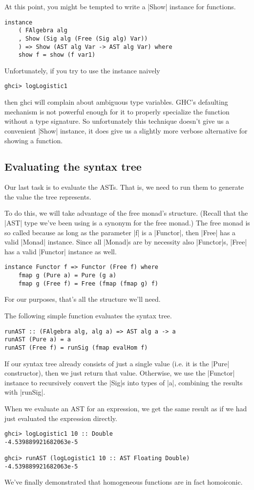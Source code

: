 \documentclass[preprint]{sigplanconf}
\theoremstyle{definition}
\begin{document}
At this point, you might be tempted to write a |Show| instance for functions.
\begin{lstlisting}
instance
    ( FAlgebra alg
    , Show (Sig alg (Free (Sig alg) Var))
    ) => Show (AST alg Var -> AST alg Var) where
    show f = show (f var1)
\end{lstlisting}
Unfortunately, if you try to use the instance naively
\begin{lstlisting}
ghci> logLogistic1
\end{lstlisting}
then ghci will complain about ambiguous type variables.
GHC's defaulting mechanism is not powerful enough for it to properly specialize the function without a type signature.
So unfortunately this technique doesn't give us a convenient |Show| instance,
it does give us a slightly more verbose alternative for showing a function.

\subsection{Evaluating the syntax tree}
Our last task is to evaluate the ASTs.
That is, we need to run them to generate the value the tree represents.

To do this, we will take advantage of the free monad's structure.
(Recall that the |AST| type we've been using is a synonym for the free monad.)
The free monad is so called because as long as the parameter |f| is a |Functor|,
then |Free| has a valid |Monad| instance.
Since all |Monad|s are by necessity also |Functor|s,
|Free| has a valid |Functor| instance as well.
\begin{lstlisting}
instance Functor f => Functor (Free f) where
    fmap g (Pure a) = Pure (g a)
    fmap g (Free f) = Free (fmap (fmap g) f)
\end{lstlisting}
For our purposes, that's all the structure we'll need.

The following simple function evaluates the syntax tree.
\begin{lstlisting}
runAST :: (FAlgebra alg, alg a) => AST alg a -> a
runAST (Pure a) = a
runAST (Free f) = runSig (fmap evalHom f)
\end{lstlisting}
If our syntax tree already consists of just a single value (i.e. it is the |Pure| constructor),
then we just return that value.
Otherwise, we use the |Functor| instance to recursively convert the |Sig|s into types of |a|,
combining the results with |runSig|.

When we evaluate an AST for an expression,
we get the same result as if we had just evaluated the expression directly.
\begin{lstlisting}
ghci> logLogistic1 10 :: Double
-4.539889921682063e-5

ghci> runAST (logLogistic1 10 :: AST Floating Double)
-4.539889921682063e-5
\end{lstlisting}
We've finally demonstrated that homogeneous functions are in fact homoiconic.
\end{document}
